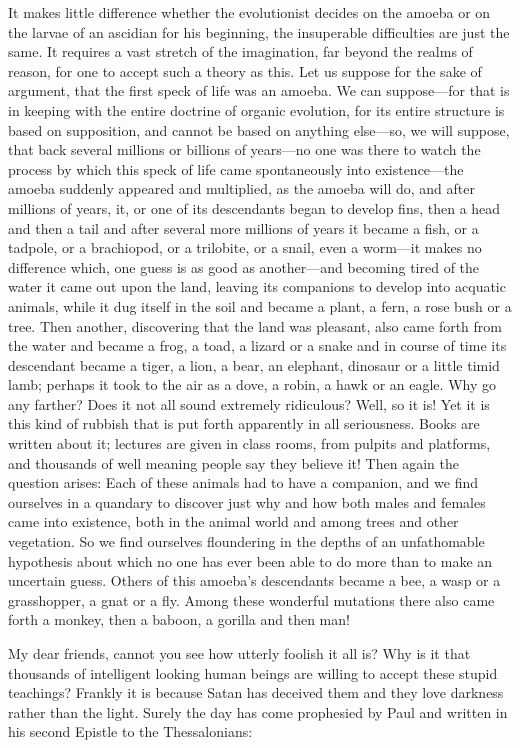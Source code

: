It makes little difference whether the evolutionist decides on the amoeba or on the larvae of
an ascidian for his beginning, the insuperable difficulties are just the same. It requires a vast
stretch of the imagination, far beyond the realms of reason, for one to accept such a theory as
this. Let us suppose for the sake of argument, that the first speck of life was an amoeba. We
can suppose—for that is in keeping with the entire doctrine of organic evolution, for its entire
structure is based on supposition, and cannot be based on anything else—so, we will
suppose, that back several millions or billions of years—no one was there to watch the
process by which this speck of life came spontaneously into existence—the amoeba suddenly
appeared and multiplied, as the amoeba will do, and after millions of years, it, or one of its
descendants began to develop fins, then a head and then a tail and after several more millions
of years it became a fish, or a tadpole, or a brachiopod, or a trilobite, or a snail, even a
worm—it makes no difference which, one guess is as good as another—and becoming tired
of the water it came out upon the land, leaving its companions to develop into acquatic
animals, while it dug itself in the soil and became a plant, a fern, a rose bush or a tree. Then
another, discovering that the land was pleasant, also came forth from the water and became a
frog, a toad, a lizard or a snake and in course of time its descendant became a tiger, a lion, a
bear, an elephant, dinosaur or a little timid lamb; perhaps it took to the air as a dove, a robin,
a hawk or an eagle. Why go any farther? Does it not all sound extremely ridiculous? Well, so
it is! Yet it is this kind of rubbish that is put forth apparently in all seriousness. Books are
written about it; lectures are given in class rooms, from pulpits and platforms, and thousands
of well meaning people say they believe it! Then again the question arises: Each of these
animals had to have a companion, and we find ourselves in a quandary to discover just why
and how both males and females came into existence, both in the animal world and among
trees and other vegetation. So we find ourselves floundering in the depths of an unfathomable
hypothesis about which no one has ever been able to do more than to make an uncertain
guess. Others of this amoeba's descendants became a bee, a wasp or a grasshopper, a gnat or
a fly. Among these wonderful mutations there also came forth a monkey, then a baboon, a
gorilla and then man!

My dear friends, cannot you see how utterly foolish it all is? Why is it that thousands of
intelligent looking human beings are willing to accept these stupid teachings? Frankly it is
because Satan has deceived them and they love darkness rather than the light. Surely the day
has come prophesied by Paul and written in his second Epistle to the Thessalonians:

